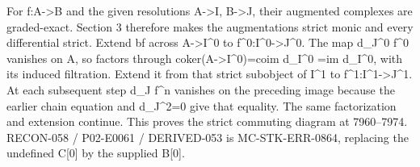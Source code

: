 \documentclass[11pt]{article}
\begin{document}
For f:\allowbreak{}A\allowbreak{}->B and the given resolutions A\allowbreak{}->I,\allowbreak{} B\allowbreak{}->J,\allowbreak{} their augmented complexes are graded-exact. Section 3 therefore makes the augmentations strict monic and every differential strict. Extend bf across A\allowbreak{}->I\textasciicircum{}0 to f\textasciicircum{}0:\allowbreak{}I\textasciicircum{}0\allowbreak{}->J\textasciicircum{}0. The map d\_\allowbreak{}J\textasciicircum{}0 f\^{}0 vanishes on A,\allowbreak{} so factors through coker(A\allowbreak{}->I\textasciicircum{}0)\allowbreak{}\allowbreak{}=coim d\_\allowbreak{}I\textasciicircum{}0 \allowbreak{}=im d\_\allowbreak{}I\textasciicircum{}0,\allowbreak{} with its induced filtration. Extend it from that strict subobject of I\^{}1 to f\textasciicircum{}1:\allowbreak{}I\textasciicircum{}1\allowbreak{}->J\textasciicircum{}1. At each subsequent step d\_\allowbreak{}J f\^{}n vanishes on the preceding image because the earlier chain equation and d\_\allowbreak{}J\textasciicircum{}2\allowbreak{}=0 give that equality. The same factorization and extension continue. This proves the strict commuting diagram at 7960–\allowbreak{}7974. RECON-058 /\allowbreak{} P02-E0061 /\allowbreak{} DERIVED-053 is MC-STK-ERR-0864,\allowbreak{} replacing the undefined C[0]\allowbreak{} by the supplied B[0]\allowbreak{}.
\end{document}
